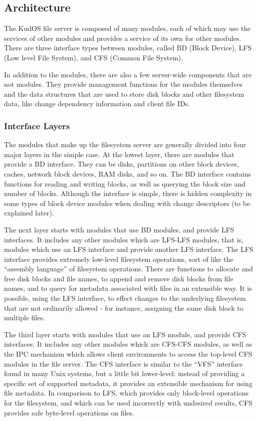 \subsection{Architecture}
\label{sec:solution:arch}

The KudOS file server is composed of many modules, each of which may use the
services of other modules and provides a service of its own for other modules.
There are three interface types between modules, called BD (Block Device), LFS
(Low level File System), and CFS (Common File System).

In addition to the modules, there are also a few server-wide components that are
not modules. They provide management functions for the modules themselves and
the data structures that are used to store disk blocks and other filesystem
data, like change dependency information and client file IDs.

\subsubsection{Interface Layers}
\label{sec:solution:arch:layers}

The modules that make up the filesystem server are generally divided into four
major layers in the simple case. At the lowest layer, there are modules that
provide a BD interface. They can be disks, partitions on other block devices,
caches, network block devices, RAM disks, and so on. The BD interface contains
functions for reading and writing blocks, as well as querying the block size and
number of blocks. Although the interface is simple, there is hidden complexity
in some types of block device modules when dealing with change descriptors (to
be explained later).

The next layer starts with modules that use BD modules, and provide LFS
interfaces. It includes any other modules which are LFS-LFS modules, that is,
modules which use an LFS interface and provide another LFS interface. The LFS
interface provides extremely low-level filesystem operations, sort of like the
``assembly language'' of filesystem operations. There are functions to allocate
and free disk blocks and file names, to append and remove disk blocks from file
names, and to query for metadata associated with files in an extensible way. It
is possible, using the LFS interface, to effect changes to the underlying
filesystem that are not ordinarily allowed - for instance, assigning the same
disk block to multiple files.

The third layer starts with modules that use an LFS module, and provide CFS
interfaces. It includes any other modules which are CFS-CFS modules, as well as
the IPC mechanism which allows client environments to access the top-level CFS
modules in the file server. The CFS interface is similar to the ``VFS''
interface found in many Unix systems, but a little bit lower-level: instead of
providing a specific set of supported metadata, it provides an extensible
mechanism for using file metadata. In comparison to LFS, which provides only
block-level operations for the filesystem, and which can be used incorrectly
with undesired results, CFS provides safe byte-level operations on files.

